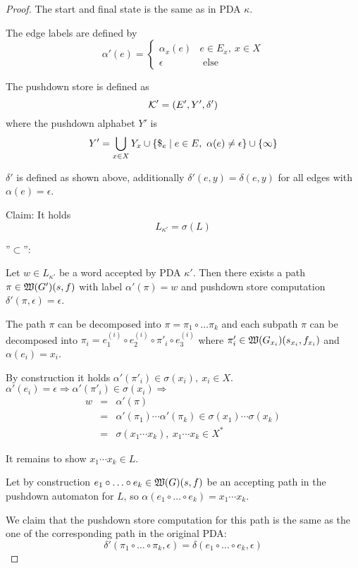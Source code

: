 \begin{proof}
The start and final state is the same as in PDA $\kappa$.

The edge labels are defined by
\[ \alpha'(e)= \begin{cases}
\alpha_x(e) & e \in E_x,\ x\in X \\
\epsilon & \text{ else}
\end{cases} \]

The pushdown store is defined as
\[ \mbox{$\mathcal{K}$}' = (E', Y', \delta') \]
where the pushdown alphabet $Y'$ is
\[ Y' = \bigcup_{x \in X} Y_x \cup \mbox{$\{{\$}_e \mid e \in E,\
\alpha(e)\neq\epsilon\}$} \cup \mbox{$\{\infty\}$} \]

$\delta'$ is defined as shown above, additionally $\delta'(e, y) = \delta(e,
y)$ for all edges with $\alpha(e)=\epsilon$.

Claim: It holds \[ L_{\kappa'} = \sigma(L) \]

''$\subset$'':

Let $w \in L_{\kappa'}$ be a word accepted by PDA $\kappa'$. Then
there exists a path $\pi \in \mbox{$\mathfrak{W}({G'})$}(s, f)$ with label
$\alpha'(\pi)=w$ and pushdown store computation $\delta'(\pi, \epsilon) =
\epsilon$.

The path $\pi$ can be decomposed into $\pi = \pi_1 \circ \ldots \pi_k$ and each
subpath $\pi$ can be decomposed into $\pi_i = e_1^{(i)} \circ e_2^{(i)}
\circ \pi'_i \circ e_3^{(i)}$ where $\pi'_i \in
\mbox{$\mathfrak{W}({G_{x_i}})$}(s_{x_i}, f_{x_i})$ and $\alpha(e_i) = x_i$.

By construction it holds $\alpha'(\pi'_i) \in \sigma(x_i),\ x_i \in X$.
$\alpha'(e_i) = \epsilon \Rightarrow \alpha'(\pi'_i) \in \sigma(x_i)
\Rightarrow$
\begin{eqnarray*}
w &=& \alpha'(\pi) \\
  &=& \alpha'(\pi_1) \cdots \alpha'(\pi_k) \in \sigma(x_1) \cdots \sigma(x_k) \\
  &=& \sigma(x_1 \cdots x_k),\ x_1 \cdots x_k \in X^*
\end{eqnarray*}

It remains to show $x_1 \cdots x_k \in L$.

Let by construction $e_1 \circ \ldots \circ e_k \in \mbox{$\mathfrak{W}({G})$}(s, f)$ be
an accepting path in the pushdown automaton for $L$, so $\alpha(e_1 \circ \ldots
\circ e_k) = x_1 \cdots x_k$.

We claim that the pushdown store computation for this path is the same as the
one of the corresponding path in the original PDA:
\[ \delta'(\pi_1 \circ \ldots \circ \pi_k, \epsilon) = \delta(e_1 \circ \ldots
\circ e_k, \epsilon) \]


\end{proof}
